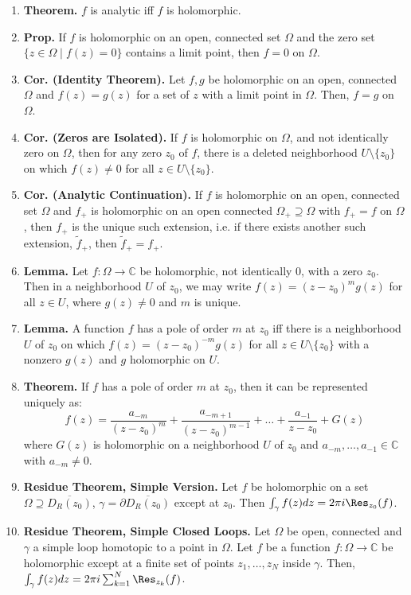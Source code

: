 \begin{enumerate}
    \item \textbf{Theorem. } $f$ is analytic iff $f$ is holomorphic. 
    \item \textbf{Prop. } If $f$ is holomorphic on an open, connected set $\Omega$ and the zero set $\{z \in \Omega \mid f(z) = 0\}$ contains a limit point, then $f=0$ on $\Omega$. 
    \item \textbf{Cor. (Identity Theorem). } Let $f,g$ be holomorphic on an open, connected $\Omega$ and $f(z)=g(z)$ for a set of $z$ with a limit point in $\Omega$. Then, $f=g$ on $\Omega$. 
    \item \textbf{Cor. (Zeros are Isolated). } If $f$ is holomorphic on $\Omega$, and not identically zero on $\Omega$, then for any zero $z_0$ of $f$, there is a deleted neighborhood $U \setminus \{z_0\}$ on which $f(z) \neq 0$ for all $z \in U \setminus \{z_0\}$. 
    \item \textbf{Cor. (Analytic Continuation). } If $f$ is holomorphic on an open, connected set $\Omega$ and $f_+$ is holomorphic on an open connected $\Omega_+ \supseteq \Omega$ with $f_+ = f$ on $\Omega$, then $f_+$ is the unique such extension, i.e. if there exists another such extension, $\tilde{f}_+$, then $\tilde{f}_+ = f_+$. 
    \item \textbf{Lemma. } Let $f: \Omega \to \mathbb{C}$ be holomorphic, not identically 0, with a zero $z_0$. Then in a neighborhood $U$ of $z_0$, we may write $f(z) = (z-z_0)^mg(z)$ for all $z \in U$, where $g(z) \neq 0$ and $m$ is unique. 
    \item \textbf{Lemma. } A function $f$ has a pole of order $m$ at $z_0$ iff there is a neighborhood $U$ of $z_0$ on which $f(z) = (z-z_0)^{-m}g(z)$ for all $z \in U \setminus \{z_0\}$ with a nonzero $g(z)$ and $g$ holomorphic on $U$. 
    \item \textbf{Theorem. } If $f$ has a pole of order $m$ at $z_0$, then it can be represented uniquely as: 
    $$
    f(z) = \frac{a_{-m}}{(z-z_0)^m} + \frac{a_{-m+1}}{(z-z_0)^{m-1}} + \dots + \frac{a_{-1}}{z-z_0} + G(z)
    $$ where $G(z)$ is holomorphic on a neighborhood $U$ of $z_0$ and $a_{-m}, \dots, a_{-1} \in \mathbb{C}$ with $a_{-m} \neq 0$. 
    \item \textbf{Residue Theorem, Simple Version. } Let $f$ be holomorphic on a set $\Omega \supseteq \overline{D_R(z_0)}$, $\gamma = \partial \overline{D_R(z_0)}$ except at $z_0$. Then $\int_\gamma f(z) dz = 2\pi i \Res_{z_0}(f)$. 
    \item \textbf{Residue Theorem, Simple Closed Loops. } Let $\Omega$ be open, connected and $\gamma$ a simple loop homotopic to a point in $\Omega$. Let $f$ be a function $f: \Omega \to \mathbb{C}$ be holomorphic except at a finite set of points $z_1, \dots, z_N$ inside $\gamma$. Then, $\int_\gamma f(z) dz = 2\pi i \sum_{k=1}^{N}\Res_{z_k}(f)$. 

\end{enumerate}
